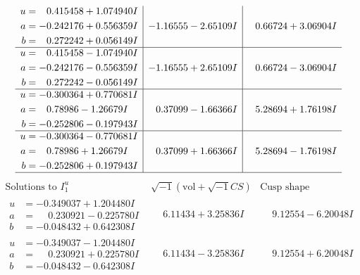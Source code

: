 \documentclass[1p]{elsarticle_modified}
\theoremstyle{definition}
\newcommand{\I}{\sqrt{-1}}
\begin{document}
$$\begin{array}{c|c|c}
\begin{aligned}
u &= \phantom{-}0.415458 + 1.074940 I \\
a &= -0.242176 + 0.556359 I \\
b &= \phantom{-}0.272242 + 0.056149 I\end{aligned}
 & -1.16555 - 2.65109 I & \phantom{-}0.66724 + 3.06904 I \\ \hline\begin{aligned}
u &= \phantom{-}0.415458 - 1.074940 I \\
a &= -0.242176 - 0.556359 I \\
b &= \phantom{-}0.272242 - 0.056149 I\end{aligned}
 & -1.16555 + 2.65109 I & \phantom{-}0.66724 - 3.06904 I \\ \hline\begin{aligned}
u &= -0.300364 + 0.770681 I \\
a &= \phantom{-}0.78986 - 1.26679 I \\
b &= -0.252806 - 0.197943 I\end{aligned}
 & \phantom{-}0.37099 - 1.66366 I & \phantom{-}5.28694 + 1.76198 I \\ \hline\begin{aligned}
u &= -0.300364 - 0.770681 I \\
a &= \phantom{-}0.78986 + 1.26679 I \\
b &= -0.252806 + 0.197943 I\end{aligned}
 & \phantom{-}0.37099 + 1.66366 I & \phantom{-}5.28694 - 1.76198 I\\
 \hline 
 \end{array}$$\newpage$$\begin{array}{c|c|c}  
\text{Solutions to }I^u_{1}& \I (\text{vol} + \sqrt{-1}CS) & \text{Cusp shape}\\
 \hline 
\begin{aligned}
u &= -0.349037 + 1.204480 I \\
a &= \phantom{-}0.230921 - 0.225780 I \\
b &= -0.048432 + 0.642308 I\end{aligned}
 & \phantom{-}6.11434 + 3.25836 I & \phantom{-}9.12554 - 6.20048 I \\ \hline\begin{aligned}
u &= -0.349037 - 1.204480 I \\
a &= \phantom{-}0.230921 + 0.225780 I \\
b &= -0.048432 - 0.642308 I\end{aligned}
 & \phantom{-}6.11434 - 3.25836 I & \phantom{-}9.12554 + 6.20048 I \\ \hline\begin{aligned}

\end{aligned}
\end{array}$$
\end{document}
